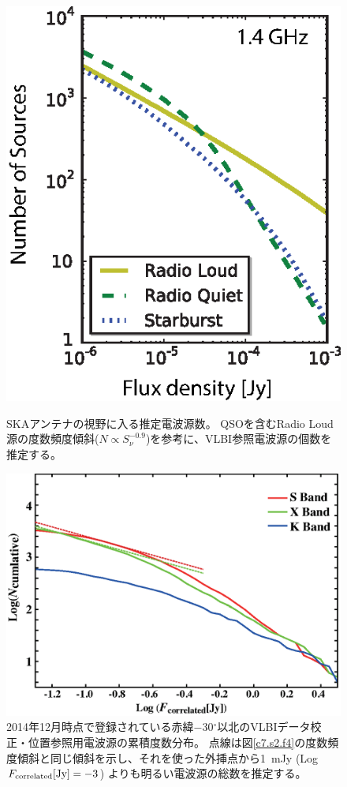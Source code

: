 \begin{figure}[t]
\begin{minipage}{7.7cm}
\begin{center}
\includegraphics[width=0.75\linewidth]{astrometry/135_Memo_QSOs}
\end{center}
\vspace{-8mm}
\caption{SKAアンテナの視野に入る推定電波源数\citep{SKA135}。
QSOを含むRadio Loud源の度数頻度傾斜($N\propto S_{\nu}^{-0.9}$)を参考に、VLBI参照電波源の個数を推定する。}
\label{c7.s2.f5}
\end{minipage}
\hspace{5mm}
\begin{minipage}{7.5cm}
\includegraphics[width=1.0\linewidth]{astrometry/SKA_calibrators.eps}
\vspace{-8mm}
\caption{2014年12月時点で登録されている赤緯$-$30$^{\circ}$以北のVLBIデータ校正・位置参照用電波源の累積度数分布。
点線は図\ref{c7.s2.f4}の度数頻度傾斜と同じ傾斜を示し、それを使った外挿点から1~mJy (Log $F_{\rm correlated}{\rm [Jy]} = -3$)
よりも明るい電波源の総数を推定する。}
\label{c7.s2.f6}
\end{minipage}
\end{figure}

